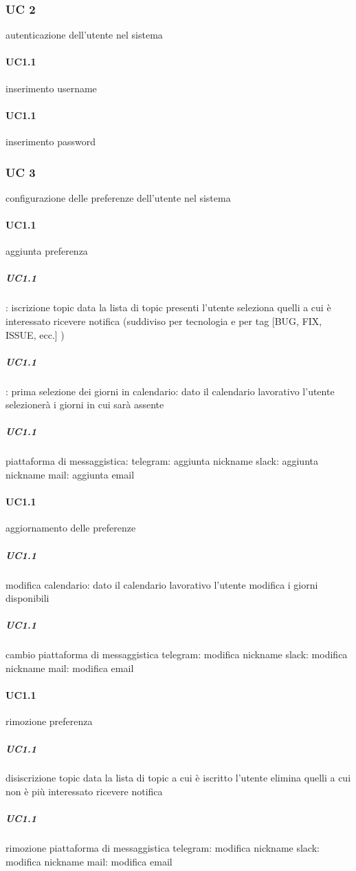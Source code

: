 \subsubsection{UC 2}
autenticazione dell'utente nel sistema
	\paragraph{UC1.1}
	inserimento username
	\paragraph{UC1.1}
	inserimento password


\subsubsection{UC 3}
configurazione delle preferenze dell'utente nel sistema

	\paragraph{UC1.1}
	aggiunta preferenza
		\subparagraph{UC1.1}:
		iscrizione topic
			data la lista di topic presenti l'utente seleziona quelli a cui è interessato ricevere notifica (suddiviso per tecnologia e per tag [BUG, FIX, ISSUE, ecc.] )
		\subparagraph{UC1.1}:
		prima selezione dei giorni in calendario:
			dato il calendario lavorativo l'utente selezionerà i giorni in cui sarà assente
		\subparagraph{UC1.1}
		piattaforma di messaggistica:
			telegram: aggiunta nickname
			slack: aggiunta nickname
			mail: aggiunta email
	\paragraph{UC1.1}
	aggiornamento delle preferenze
		\subparagraph{UC1.1}
		modifica calendario:
			dato il calendario lavorativo l'utente modifica i giorni disponibili
		\subparagraph{UC1.1}
		cambio piattaforma di messaggistica
			telegram: modifica nickname
			slack: modifica nickname
			mail: modifica email
	\paragraph{UC1.1}
	rimozione preferenza
		\subparagraph{UC1.1}
		disiscrizione topic
			data la lista di topic a cui è iscritto l'utente elimina quelli a cui non è più interessato ricevere notifica
		\subparagraph{UC1.1}
		rimozione piattaforma di messaggistica
			telegram: modifica nickname
			slack: modifica nickname
			mail: modifica email		
		
		
		
		